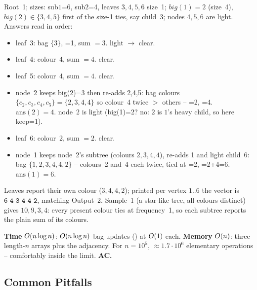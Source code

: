 \begin{tracebox}[CF 600E sample 2: n=6, colours 1 2 3 4 4 2, edges (1,2)(1,6)(2,3)(2,4)(2,5)]
Root~1; sizes: sub\(1\)=6, sub\(2\)=4, leaves \(3,4,5,6\) size~1;
\(\mathit{big}(1)=2\) (size~4), \(\mathit{big}(2)\in\{3,4,5\}\) first of the size-1
ties, say child~3; nodes \(4,5,6\) are light.  Answers read in  order:
\begin{itemize}[nosep,leftmargin=1.4em]
  \item leaf~3: bag \(\{3\}\), =1, sum \(=3\).  light \(\to\) clear.
  \item leaf~4: colour~4, sum \(=4\).  clear.
  \item leaf~5: colour~4, sum \(=4\).  clear.
  \item node~2 keeps big(2)=3 then re-adds 2,4,5: bag colours
        \(\{c_2,c_3,c_4,c_5\}=\{2,3,4,4\}\) so colour~4 twice \(>\) others --
        =2, =4.  \(\mathrm{ans}(2)=4\).  node~2 is
        light (big(1)=2? no: \(2\) is \(1\)'s heavy child, so here keep=1).
  \item leaf~6: colour~2, sum \(=2\).  clear.
  \item node~1 keeps node~2's subtree (colours \(2,3,4,4\)), re-adds 1 and light
        child~6: bag \(\{1,2,3,4,4,2\}\) -- colours~2 and~4 each twice, tied at
        =2, =2+4=6.  \(\mathrm{ans}(1)=6\).
\end{itemize}
Leaves report their own colour (\(3,4,4,2\)); printed per vertex \(1..6\) the
vector is \(\texttt{6 4 3 4 4 2}\), matching Output~2.  Sample~1 (a star-like
tree, all colours distinct) gives \(10,9,3,4\): every present colour ties at
frequency~1, so each subtree reports the plain sum of its colours.
\end{tracebox}

\begin{complexitybox}[CF 600E]
\textbf{Time} \(O(n\log n)\): \(O(n\log n)\) bag updates
() at \(O(1)\) each.  \textbf{Memory} \(O(n)\): three
length-\(n\) arrays plus the adjacency.  For \(n=10^5\), \(\approx
1.7\cdot10^6\) elementary operations -- comfortably inside the limit.
\textbf{AC.}
\end{complexitybox}

\subsection{Common Pitfalls}

